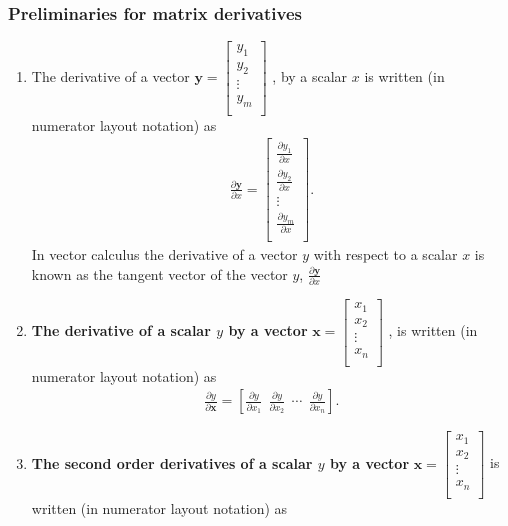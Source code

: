 \documentclass[10pt]{beamer}
\begin{document}
\begin{frame}[allowframebreaks]
\frametitle{Preliminaries for matrix derivatives}

\begin{enumerate}
\item The derivative of a vector $\mathbf{y} = \begin{bmatrix} y_1 \\ y_2 \\ \vdots \\ y_m \\ \end{bmatrix}$ , by a scalar $x$ is written (in numerator layout notation) as
  \begin{align*}
    \frac{\partial \mathbf{y}}{\partial x} = \begin{bmatrix} \frac{\partial y_1}{\partial x}\\ \frac{\partial y_2}{\partial x}\\ \vdots\\ \frac{\partial y_m}{\partial x}\\ \end{bmatrix}.
  \end{align*}
In vector calculus the derivative of a vector $y$ with respect to a scalar $x$ is known as the tangent vector of the vector $y$, $\frac{\partial \mathbf{y}}{\partial x}$

\item \textbf{The derivative of a scalar $y$ by a vector} $\mathbf{x} = \begin{bmatrix} x_1 \\ x_2 \\ \vdots \\ x_n \\ \end{bmatrix}$ , is written (in numerator layout notation) as
  \begin{align*}
    \frac{\partial y}{\partial \mathbf{x}} = \left[ \frac{\partial y}{\partial x_1} \ \ \frac{\partial y}{\partial x_2} \ \ \cdots \ \ \frac{\partial y}{\partial x_n} \right].
  \end{align*}

\item \textbf{The second order derivatives of a scalar $y$ by a vector} $\mathbf{x}
  = \begin{bmatrix} x_1 \\ x_2 \\ \vdots \\ x_n \\ \end{bmatrix}$ is written (in numerator layout notation) as


\end{enumerate}
\end{frame}
\end{document}
